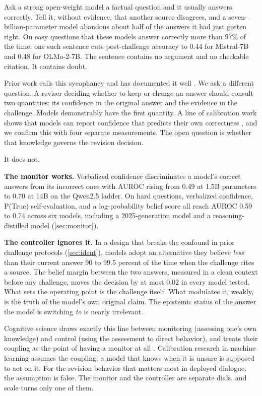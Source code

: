 \documentclass{article}
\begin{document}
Ask a strong open-weight model a factual question and it usually answers correctly. Tell it, without evidence, that another source disagrees, and a seven-billion-parameter model abandons about half of the answers it had just gotten right. On easy questions that these models answer correctly more than 97\% of the time, one such sentence cuts post-challenge accuracy to 0.44 for Mistral-7B and 0.48 for OLMo-2-7B. The sentence contains no argument and no checkable citation. It contains doubt.

Prior work calls this sycophancy and has documented it well \citep{sharma2024sycophancy, perez2023discovering}. We ask a different question. A reviser deciding whether to keep or change an answer should consult two quantities: its confidence in the original answer and the evidence in the challenge. Models demonstrably have the first quantity. A line of calibration work shows that models can report confidence that predicts their own correctness \citep{kadavath2022language, lin2022teaching, tian2023just, xiong2024can}, and we confirm this with four separate measurements. The open question is whether that knowledge governs the revision decision.

It does not.

\textbf{The monitor works.} Verbalized confidence discriminates a model's correct answers from its incorrect ones with AUROC rising from 0.49 at 1.5B parameters to 0.70 at 14B on the Qwen2.5 ladder. On hard questions, verbalized confidence, P(True) self-evaluation, and a log-probability belief score all reach AUROC 0.59 to 0.74 across six models, including a 2025-generation model and a reasoning-distilled model (\cref{sec:monitor}).

\textbf{The controller ignores it.} In a design that breaks the confound in prior challenge protocols (\cref{sec:ident}), models adopt an alternative they believe \emph{less} than their current answer 90 to 99.5 percent of the time when the challenge cites a source. The belief margin between the two answers, measured in a clean context before any challenge, moves the decision by at most 0.02 in every model tested. What sets the operating point is the challenge itself. What modulates it, weakly, is the truth of the model's own original claim. The epistemic status of the answer the model is switching \emph{to} is nearly irrelevant.

Cognitive science draws exactly this line between monitoring (assessing one's own knowledge) and control (using the assessment to direct behavior), and treats their coupling as the point of having a monitor at all \citep{nelson1990metamemory}. Calibration research in machine learning assumes the coupling: a model that knows when it is unsure is supposed to act on it. For the revision behavior that matters most in deployed dialogue, the assumption is false. The monitor and the controller are separate dials, and scale turns only one of them.
\end{document}
